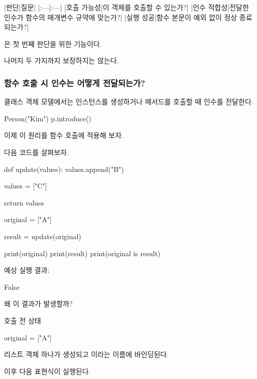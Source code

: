 \begin{dhktable}
|판단|질문|
|:---|:---|
|호출 가능성|이 객체를 호출할 수 있는가?|
|인수 적합성|전달한 인수가 함수의 매개변수 규약에 맞는가?|
|실행 성공|함수 본문이 예외 없이 정상 종료되는가?|
\end{dhktable}

은 첫 번째 판단을 위한 기능이다.

나머지 두 가지까지 보장하지는 않는다.

\subsubsection{함수 호출 시 인수는 어떻게 전달되는가?}

클래스 객체 모델에서는 인스턴스를 생성하거나 메서드를 호출할 때 인수를 전달한다.

\begin{dhkcode}
Person("Kim")
p.introduce()
\end{dhkcode}

이제 이 원리를 함수 호출에 적용해 보자.

다음 코드를 살펴보자.

\begin{dhkcode}
def update(values):
    values.append("B")

    values = ["C"]

    return values

original = ["A"]

result = update(original)

print(original)
print(result)
print(original is result)
\end{dhkcode}

예상 실행 결과:

\begin{dhkzsh}
['A', 'B']
['C']
False
\end{dhkzsh}

왜 이 결과가 발생할까?

\begin{dhknote}
\begin{dhksmry}[centered]
호출 전 상태
\end{dhksmry}
\end{dhknote}

\begin{dhkcode}
original = ["A"]
\end{dhkcode}

리스트 객체 하나가 생성되고 이라는 이름에 바인딩된다.

이후 다음 표현식이 실행된다.

